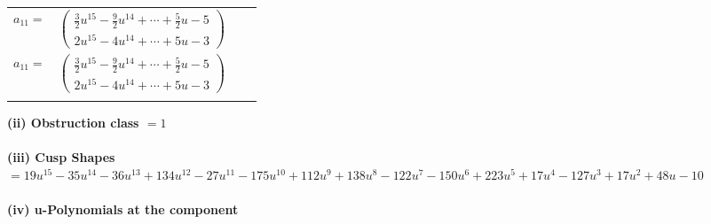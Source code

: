 \documentclass[1p]{elsarticle_modified}
\theoremstyle{definition}
\begin{document}
\begin{tabular}{m{7pt} m{180pt} m{7pt} m{180pt} }
\flushright $a_{11}=$&$\begin{pmatrix}\frac{3}{2} u^{15}-\frac{9}{2} u^{14}+\cdots+\frac{5}{2} u-5\\2 u^{15}-4 u^{14}+\cdots+5 u-3\end{pmatrix}$\\ \flushright $a_{11}=$&$\begin{pmatrix}\frac{3}{2} u^{15}-\frac{9}{2} u^{14}+\cdots+\frac{5}{2} u-5\\2 u^{15}-4 u^{14}+\cdots+5 u-3\end{pmatrix}$\\&\end{tabular}
\flushleft \textbf{(ii) Obstruction class $= 1$}\\~\\
\flushleft \textbf{(iii) Cusp Shapes $= 19 u^{15}-35 u^{14}-36 u^{13}+134 u^{12}-27 u^{11}-175 u^{10}+112 u^9+138 u^8-122 u^7-150 u^6+223 u^5+17 u^4-127 u^3+17 u^2+48 u-10$}\\~\\
\newpage\renewcommand{\arraystretch}{1}
\flushleft \textbf{(iv) u-Polynomials at the component}\newline \\
\end{document}
